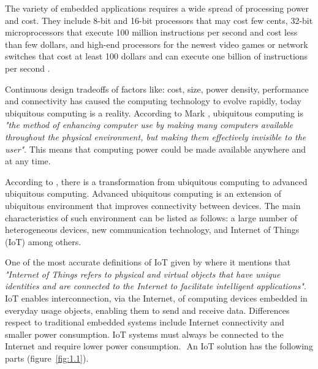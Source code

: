 The variety of embedded applications requires a wide spread of processing power
and cost. They include 8-bit and 16-bit processors that may cost few cents,
32-bit microprocessors that execute 100 million instructions per second and
cost less than few dollars, and high-end processors for the newest video games
or network switches that cost at least 100 dollars and can execute one billion
of instructions per second \cite{Hennessy}.

Continuous design tradeoffs of factors like: cost, size, power density,
performance and connectivity has caused the computing technology to evolve
rapidly, today ubiquitous computing is a reality. According to Mark
\cite{Mark}, ubiquitous computing is \textit{"the method of enhancing computer
use by making many computers available throughout the physical environment, but
making them effectively invisible to the user"}. This means that computing
power could be made available anywhere and at any time. 


According to \cite{Nur}, there is a transformation from ubiquitous computing to
advanced ubiquitous computing. Advanced ubiquitous computing is an extension of
ubiquitous environment that improves connectivity between devices. The main
characteristics of such environment can be listed as follows: a large number of
heterogeneous devices, new communication technology, and Internet of Things
(IoT) among others. 

One of the most accurate definitions of IoT given by \cite{Bahga} where it
mentions that \textit{"Internet of Things refers to physical and virtual
objects that have unique identities and are connected to the Internet to
facilitate intelligent applications"}. IoT enables interconnection, via the
Internet, of computing devices embedded in everyday usage objects, enabling
them to send and receive data. Differences respect to traditional embedded
systems include Internet connectivity and smaller power consumption. IoT
systems must always be connected to the Internet and require lower power
consumption.  An IoT solution has the following parts (figure~\ref{fig:1.1}).


